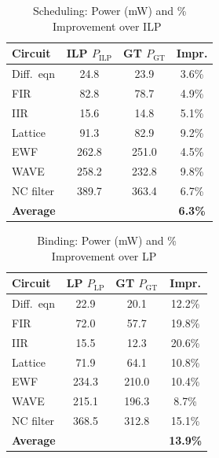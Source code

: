 \documentclass[conference]{IEEEtran}
\begin{document}
\begin{table}[t]
\caption{Scheduling: Power (mW) and \% Improvement over ILP~\cite{murugavel2003}}
\label{tab:sched}
\centering
\footnotesize
\begin{tabular}{lccc}
\toprule
Circuit & ILP $P_{\mathrm{ILP}}$ & GT $P_{\mathrm{GT}}$ & Impr. \\
\midrule
Diff.\ eqn & 24.8 & 23.9 & 3.6\% \\
FIR & 82.8 & 78.7 & 4.9\% \\
IIR & 15.6 & 14.8 & 5.1\% \\
Lattice & 91.3 & 82.9 & 9.2\% \\
EWF & 262.8 & 251.0 & 4.5\% \\
WAVE & 258.2 & 232.8 & 9.8\% \\
NC filter & 389.7 & 363.4 & 6.7\% \\
\midrule
\textbf{Average} & & & \textbf{6.3\%} \\
\bottomrule
\end{tabular}
\end{table}

\begin{table}[t]
\caption{Binding: Power (mW) and \% Improvement over LP~\cite{murugavel2003}}
\label{tab:bind}
\centering
\footnotesize
\begin{tabular}{lccc}
\toprule
Circuit & LP $P_{\mathrm{LP}}$ & GT $P_{\mathrm{GT}}$ & Impr. \\
\midrule
Diff.\ eqn & 22.9 & 20.1 & 12.2\% \\
FIR & 72.0 & 57.7 & 19.8\% \\
IIR & 15.5 & 12.3 & 20.6\% \\
Lattice & 71.9 & 64.1 & 10.8\% \\
EWF & 234.3 & 210.0 & 10.4\% \\
WAVE & 215.1 & 196.3 & 8.7\% \\
NC filter & 368.5 & 312.8 & 15.1\% \\
\midrule
\textbf{Average} & & & \textbf{13.9\%} \\
\bottomrule
\end{tabular}
\end{table}
\end{document}
